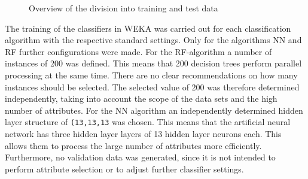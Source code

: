 \begin{figure}[ht]
  \qquad
  \qquad
  \caption{Overview of the division into training and test data\label{fig:splits}}
\end{figure}

The training of the classifiers in WEKA was carried out for each classification algorithm with the respective standard settings. Only for the algorithms NN and RF further configurations were made. For the RF-algorithm a number of instances of 200 was defined. This means that 200 decision trees perform parallel processing at the same time. There are no clear recommendations on how many instances should be selected. The selected value of 200 was therefore determined independently, taking into account the scope of the data sets and the high number of attributes. For the NN algorithm an independently determined hidden layer structure of \texttt{(13,13,13} was chosen. This means that the artificial neural network has three hidden layer layers of 13 hidden layer neurons each. This allows them to process the large number of attributes more efficiently. Furthermore, no validation data was generated, since it is not intended to perform attribute selection or to adjust further classifier settings.

